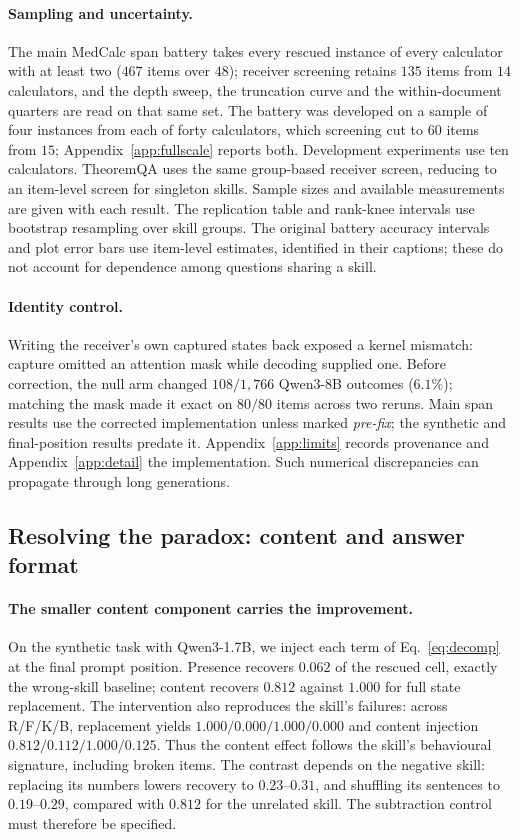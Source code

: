 \documentclass{article}
\begin{document}
\paragraph{Sampling and uncertainty.}
The main MedCalc span battery takes every rescued instance of every calculator
with at least two ($467$ items over $48$); receiver screening retains $135$
items from $14$ calculators, and the depth sweep, the truncation curve and the
within-document quarters are read on that same set. The battery was developed on
a sample of four instances from each of forty calculators, which screening cut
to $60$ items from $15$; Appendix~\ref{app:fullscale} reports both.
Development experiments use ten calculators.
TheoremQA uses the same group-based receiver screen, reducing to an item-level
screen for singleton skills. Sample sizes and available measurements are given
with each result. The replication table and rank-knee intervals use bootstrap
resampling over skill groups. The original battery accuracy intervals and plot
error bars use item-level estimates, identified in their captions; these do not
account for dependence among questions sharing a skill.

\paragraph{Identity control.}
Writing the receiver's own captured states back exposed a kernel mismatch:
capture omitted an attention mask while decoding supplied one. Before correction,
the null arm changed $108/1{,}766$ Qwen3-8B outcomes ($6.1\%$); matching the mask
made it exact on $80/80$ items across two reruns. Main span results use the
corrected implementation unless marked \emph{pre-fix}; the synthetic and
final-position results predate it. Appendix~\ref{app:limits} records provenance
and Appendix~\ref{app:detail} the implementation. Such numerical discrepancies
\citep{he2025nondeterminism} can propagate through long generations.

\subsection{Resolving the paradox: content and answer format}
\label{sec:decomp}

\paragraph{The smaller content component carries the improvement.}
On the synthetic task with Qwen3-1.7B, we inject each term of
Eq.~\ref{eq:decomp} at the final prompt position. Presence recovers $0.062$ of
the rescued cell, exactly the wrong-skill baseline; content recovers $0.812$
against $1.000$ for full state replacement. The intervention also reproduces
the skill's failures: across R/F/K/B, replacement yields
$1.000/0.000/1.000/0.000$ and content injection
$0.812/0.112/1.000/0.125$. Thus the content effect follows the skill's
behavioural signature, including broken items. The contrast depends on the
negative skill: replacing its numbers lowers recovery to $0.23$--$0.31$, and
shuffling its sentences to $0.19$--$0.29$, compared with $0.812$ for the unrelated
skill. The subtraction control must therefore be specified.
\end{document}
